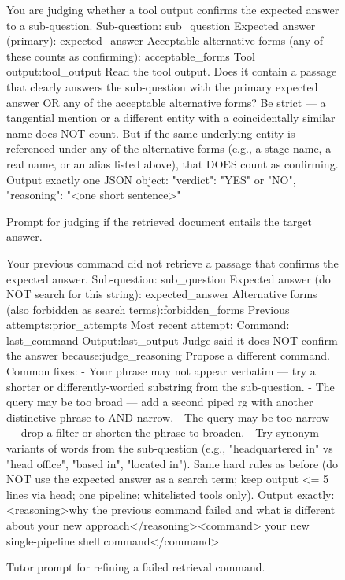 \documentclass{llmxive}
\begin{document}
\begin{figure}[!t]
\begin{promptbox}
You are judging whether a tool output confirms the expected answer to a sub-question.
Sub-question: {sub_question}
Expected answer (primary): {expected_answer}
Acceptable alternative forms (any of these counts as confirming): {acceptable_forms}
Tool output:{tool_output}
Read the tool output. Does it contain a passage that clearly answers the sub-question with the primary expected answer OR any of the acceptable alternative forms? Be strict — a tangential mention or a different entity with a coincidentally similar name does NOT count. But if the same underlying entity is referenced under any of the alternative forms (e.g., a stage name, a real name, or an alias listed above), that DOES count as confirming.
Output exactly one JSON object:
{{"verdict": "YES" or "NO", "reasoning": "<one short sentence>"}}
\end{promptbox}
\vspace{-0.4cm}
\caption{Prompt for judging if the retrieved document entails the target answer.}
\label{fig:prompt_judge}
\end{figure}

\begin{figure}[!t]
\begin{promptbox}
Your previous command did not retrieve a passage that confirms the expected answer.
Sub-question: {sub_question}
Expected answer (do NOT search for this string): {expected_answer}
Alternative forms (also forbidden as search terms):{forbidden_forms}
Previous attempts:{prior_attempts}
Most recent attempt: Command: {last_command} Output:{last_output}
Judge said it does NOT confirm the answer because:{judge_reasoning}
Propose a different command. Common fixes:
- Your phrase may not appear verbatim — try a shorter or differently-worded substring from the sub-question.
- The query may be too broad — add a second piped rg with another distinctive phrase to AND-narrow.
- The query may be too narrow — drop a filter or shorten the phrase to broaden.
- Try synonym variants of words from the sub-question (e.g., "headquartered in" vs "head office", "based in", "located in").
Same hard rules as before (do NOT use the expected answer as a search term; keep output <= 5 lines via head; one pipeline; whitelisted tools only).
Output exactly:<reasoning>why the previous command failed and what is different about your new approach</reasoning><command>
your new single-pipeline shell command</command>
\end{promptbox}
\vspace{-0.4cm}
\caption{Tutor prompt for refining a failed retrieval command.}
\label{fig:prompt_backward_refine}
\end{figure}
\end{document}
